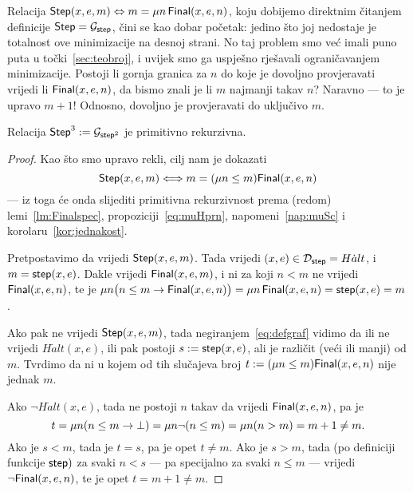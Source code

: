 Relacija $\mathsf{Step}(x,e,m)\Leftrightarrow m= \mu n\,\mathsf{Final}(x,e,n)$, koju dobijemo direktnim čitanjem definicije $\mathsf{Step}=\mathcal G_{\mathsf{step}}$, čini se kao dobar početak: jedino što joj nedostaje je totalnost ove minimizacije na desnoj strani. No taj problem smo već imali puno puta u točki~\ref{sec:teobroj}, i uvijek smo ga uspješno rješavali ograničavanjem minimizacije. Postoji li gornja granica za $n$ do koje je dovoljno provjeravati vrijedi li $\mathsf{Final}(x,e,n)$, da bismo znali je li $m$ najmanji takav $n$? Naravno --- to je upravo $m+1$! Odnosno, dovoljno je provjeravati do uključivo $m$.

\begin{lema}
Relacija $\mathsf{Step}^3:=\mathcal G_{\mathsf{step}^2}$ je primitivno rekurzivna.
\end{lema}

\begin{proof}
Kao što smo upravo rekli, cilj nam je dokazati
\begin{equation}
    \mathsf{Step}(x,e,m)\Longleftrightarrow m=(\mu n\le m)\mathsf{Final}(x,e,n)
\end{equation}
--- iz toga će onda slijediti primitivna rekurzivnost prema (redom) lemi~\ref{lm:Finalspec}, propoziciji~\ref{eq:muHprn}, napomeni~\ref{nap:muSc} i korolaru~\ref{kor:jednakost}.

Pretpostavimo da vrijedi $\mathsf{Step}(x,e,m)$. Tada vrijedi $(x,e)\in\mathcal D_{\mathsf{step}}=H\dot alt$, i $m=\mathsf{step}(x,e)$. Dakle vrijedi $\mathsf{Final}(x,e,m)$, i ni za koji $n<m$ ne vrijedi $\mathsf{Final}(x,e,n)$, te je $\mu n\bigl(n\le m\to\mathsf{Final}(x,e,n)\bigr)=\mu n\,\mathsf{Final}(x,e,n)=\mathsf{step}(x,e)=m$.

Ako pak ne vrijedi $\mathsf{Step}(x,e,m)$, tada negiranjem~\eqref{eq:defgraf} vidimo da ili ne vrijedi $H\dot alt(x,e)$, ili pak postoji $s:=\mathsf{step}(x,e)$, ali je različit (veći ili manji) od $m$. Tvrdimo da ni u kojem od tih slučajeva broj $t:=(\mu n\le m)\mathsf{Final}(x,e,n)$ nije jednak $m$.

Ako $\lnot H\dot alt(x,e)$, tada ne postoji $n$ takav da vrijedi $\mathsf{Final}(x,e,n)$, pa je
\begin{equation}
    t = \mu n(n\le m\to\bot)=\mu n\lnot(n\le m)=\mu n(n>m)= m+1\not=m\text.
\end{equation}
Ako je $s<m$, tada je $t=s$, pa je opet $t\not=m$. Ako je $s>m$, tada (po definiciji funkcije $\mathsf{step})$ za svaki $n<s$ --- pa specijalno za svaki $n\le m$ --- vrijedi $\lnot\mathsf{Final}(x,e,n)$, te je opet $t=m+1\not=m$.
\end{proof}

